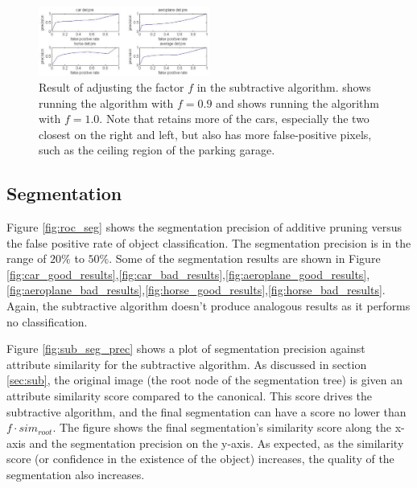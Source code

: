\documentclass[10pt,twocolumn,letterpaper]{article}
\begin{document}
\begin{figure}
\centering
\includegraphics[width=0.5\textwidth]{figures/add_res/roc_class.png.eps}
\caption{Result of adjusting the factor $f$ in the subtractive
algorithm.  shows running the algorithm with $f=0.9$
and  shows running the algorithm with $f=1.0$.  Note
that  retains more of the cars, especially the two
closest on the right and left, but also has more false-positive
pixels, such as the ceiling region of the parking garage.}
\label{fig:roc_class}
\end{figure}


\subsection{Segmentation}
\label{ssec:segmentation}

Figure \ref{fig:roc_seg} shows the segmentation precision of additive pruning 
versus the false positive rate of object classification. The segmentation precision
is in the range of $20\%$ to $50\%$. Some of the segmentation results are shown in 
Figure \ref{fig:car_good_results},\ref{fig:car_bad_results},\ref{fig:aeroplane_good_results},\ref{fig:aeroplane_bad_results},\ref{fig:horse_good_results},\ref{fig:horse_bad_results}.  Again, the subtractive algorithm doesn't produce
analogous results as it performs no classification.

Figure \ref{fig:sub_seg_prec} shows a plot of segmentation precision against 
attribute similarity for the subtractive algorithm.  As discussed in section 
\ref{sec:sub}, the original image (the root node of the segmentation tree)
is given an attribute similarity score compared to the canonical.  This score
drives the subtractive algorithm, and the final segmentation can have a score
no lower than $f\cdot sim_{root}$.  The figure shows the final segmentation's
similarity score along the x-axis and the segmentation precision on the y-axis.
As expected, as the similarity score (or confidence in the existence of the
object) increases, the quality of the segmentation also increases.
\end{document}
